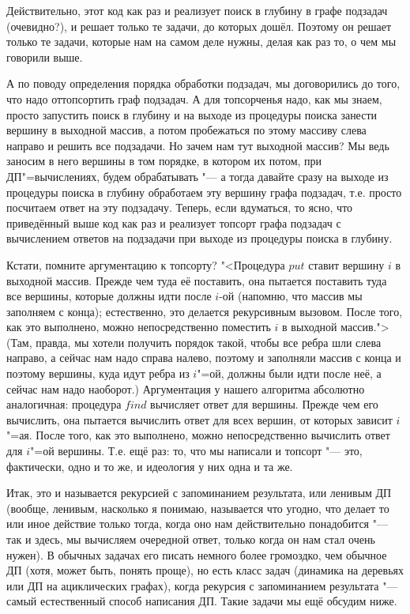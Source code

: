 Действительно, этот код как раз и реализует поиск в глубину в графе подзадач (очевидно?), и решает только те задачи, до которых дошёл. Поэтому он решает только те задачи, которые нам на самом деле нужны, делая как раз то, о чем мы говорили выше.

А по поводу определения порядка обработки подзадач, мы договорились до того, что надо оттопсортить граф подзадач. А для топсорченья надо, как мы знаем, просто запустить поиск в глубину и на выходе из процедуры поиска занести вершину в выходной массив, а потом пробежаться по этому массиву слева направо и решить все подзадачи. Но зачем нам тут выходной массив? Мы ведь заносим в него вершины в том порядке, в котором их потом, при ДП"=вычислениях, будем обрабатывать "--- а тогда давайте сразу на выходе из процедуры поиска в глубину обработаем эту вершину графа подзадач, т.е. просто посчитаем ответ на эту подзадачу. Теперь, если вдуматься, то ясно, что приведённый выше код как раз и реализует топсорт графа подзадач с вычислением ответов на подзадачи при выходе из процедуры поиска в глубину.

Кстати, помните аргументацию к топсорту? "<Процедура $put$ ставит вершину $i$ в выходной массив. Прежде чем туда её поставить, она пытается поставить туда все вершины, которые должны идти после $i$-ой (напомню, что массив мы заполняем с конца); естественно, это делается рекурсивным вызовом. После того, как это выполнено, 
можно непосредственно поместить $i$ в выходной массив."> (Там, правда, мы хотели получить порядок такой, чтобы все ребра шли слева направо, а сейчас нам надо справа налево, поэтому и заполняли массив с конца и поэтому вершины, куда идут ребра из $i$"=ой, должны были идти после неё, а сейчас нам надо наоборот.) Аргументация у нашего алгоритма абсолютно аналогичная: процедура $find$ вычисляет ответ для вершины. Прежде чем его вычислить, она пытается вычислить ответ для всех вершин, от которых зависит $i$"=ая. После того, как это выполнено, можно непосредственно вычислить ответ для $i$"=ой вершины. Т.е. ещё раз: то, что мы написали и топсорт "--- это, фактически, одно и то же, и идеология у них одна и та же.

Итак, это и называется рекурсией с запоминанием результата, или ленивым ДП (вообще, ленивым, насколько я понимаю, называется что угодно, что делает то или иное действие только тогда, когда оно нам действительно понадобится "--- так и здесь, мы вычисляем очередной ответ, только когда он нам стал очень нужен). В обычных задачах его писать немного более громоздко, чем обычное ДП (хотя, может быть, понять проще), но есть класс задач (динамика на деревьях или ДП на ациклических графах), когда рекурсия с запоминанием результата "--- самый естественный способ написания ДП. Такие задачи мы ещё обсудим ниже.

